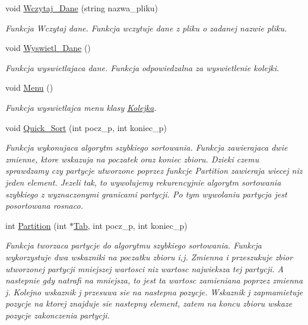 \begin{DoxyCompactItemize}
void \hyperlink{class_kolejka_a449374680f4f4cc633f067c4fb0fac3d}{\-Wczytaj\-\_\-\-Dane} (string nazwa\-\_\-pliku)
\begin{DoxyCompactList}\small\item\em \-Funkcja \-Wczytaj dane. \-Funkcja wczytuje dane z pliku o zadanej nazwie pliku. \end{DoxyCompactList}\item 
void \hyperlink{class_kolejka_a2feb88aa9e6b9af5c14e6e9fde851966}{\-Wyswietl\-\_\-\-Dane} ()
\begin{DoxyCompactList}\small\item\em \-Funkcja wyswietlajaca dane. \-Funkcja odpowiedzalna za wyswietlenie kolejki. \end{DoxyCompactList}\item 
void \hyperlink{class_kolejka_adf3fa87d0693b7f11835e8a67d2efcc1}{\-Menu} ()
\begin{DoxyCompactList}\small\item\em \-Funkcja wyswietlajca menu klasy \hyperlink{class_kolejka}{\-Kolejka}. \end{DoxyCompactList}\item 
void \hyperlink{class_kolejka_a29d7138233171af5ac991e4ef4597eb4}{\-Quick\-\_\-\-Sort} (int pocz\-\_\-p, int koniec\-\_\-p)
\begin{DoxyCompactList}\small\item\em \-Funkcja wykonujaca algorytm szybkiego sortowania. \-Funkcja zawierajaca dwie zmienne, ktore wskazuja na poczatek oraz koniec zbioru. \-Dzieki czemu sprawdzamy czy partycje utworzone poprzez funkcje \-Partition zawieraja wiecej niz jeden element. \-Jezeli tak, to wywolujemy rekurencyjnie algorytm sortowania szybkiego z wyznaczonymi granicami partycji. \-Po tym wywolaniu partycja jest posortowana rosnaco. \end{DoxyCompactList}\item 
int \hyperlink{class_kolejka_a96d9cb5d8cc8da6d1db542e6412a3fd5}{\-Partition} (int $\ast$\hyperlink{class_kolejka_adfbcda2500bf9d82a22d8d717ee6f695}{\-Tab}, int pocz\-\_\-p, int koniec\-\_\-p)
\begin{DoxyCompactList}\small\item\em \-Funkcja tworzaca partycje do algorytmu szybkiego sortowania. \-Funkcja wykorzystuje dwa wskazniki na poczatku zbioru i,j. \-Zmienna i przeszukuje zbior utworzonej partycji mniejszej wartosci niz wartosc najwieksza tej partycji. \-A nastepnie gdy natrafi na mniejsza, to jest ta wartosc zamieniana poprzez zmienna j. \-Kolejno wskaznik j przesuwa sie na nastepna pozycje. \-Wskaznik j zapmamietuje pozycje na ktorej znajduje sie nastepny element, zatem na koncu zbioru wskaze pozycje zakonczenia partycji. \end{DoxyCompactList}\item 

\end{DoxyCompactItemize}
